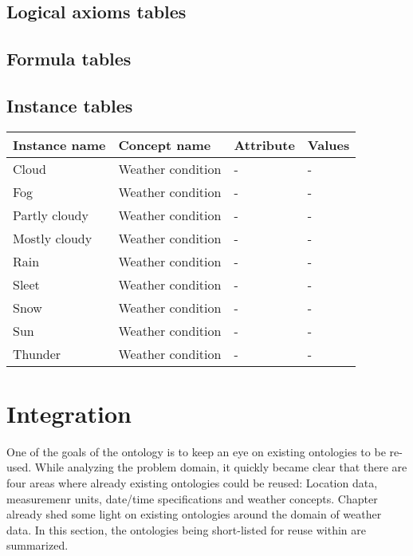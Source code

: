 \subsection{Logical axioms tables}


\subsection{Formula tables}


\subsection{Instance tables}

\begin{longtable}{|p{}|p{}|p{}|p{}|}
  \hline
  \textbf{Instance name} & \textbf{Concept name} & \textbf{Attribute} & \textbf{Values} \\
  \hline\hline
  Cloud & Weather condition & - & - \\
  \hline
  Fog & Weather condition & - & - \\
  \hline
  Partly cloudy & Weather condition & - & - \\
  \hline
  Mostly cloudy & Weather condition & - & - \\
  \hline
  Rain & Weather condition & - & - \\
  \hline
  Sleet & Weather condition & - & - \\
  \hline
  Snow & Weather condition & - & - \\
  \hline
  Sun & Weather condition & - & - \\
  \hline
  Thunder & Weather condition & - & - \\
  \hline
\end{longtable}

\section{Integration}

One of the goals of the \thinkhomeweather ontology is to keep an eye on existing ontologies to be re-used. While analyzing the problem domain, it quickly became clear that there are four areas where already existing ontologies could be reused: Location data, measuremenr units, date/time specifications and weather concepts. Chapter \label{ch:existing_work} already shed some light on existing ontologies around the domain of weather data. In this section, the ontologies being short-listed for reuse within \thinkhomeweather are summarized.

